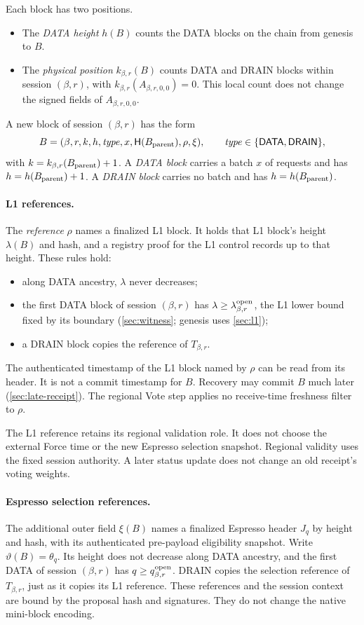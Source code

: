 \documentclass[11pt,a4paper]{article}
\newcommand{\Hash}{\mathsf H}
\newcommand{\tagg}[1]{\ensuremath{\mathsf{#1}}}
\newcommand{\defterm}[1]{\textcolor{rrBlue}{\textit{#1}}}
\begin{document}
Each block has two positions.
\begin{itemize}
\item The \defterm{DATA height} $h(B)$ counts the DATA blocks on the chain
from genesis to $B$.
\item The \defterm{physical position} $k_{\beta,r}(B)$ counts DATA and DRAIN blocks
within session $(\beta,r)$, with $k_{\beta,r}(A_{\beta,r,0,0})=0$. This local count does not change
the signed fields of $A_{\beta,r,0,0}$.
\end{itemize}
A new block of session $(\beta,r)$ has the form
\[
 B=(\beta,r,k,h,\mathit{type},x,\Hash(B_{\rm parent}),\rho,\xi),
 \qquad \mathit{type}\in\{\tagg{DATA},\tagg{DRAIN}\},
\]
with $k=k_{\beta,r}(B_{\rm parent})+1$. A \defterm{DATA block} carries a batch $x$ of
requests and has $h=h(B_{\rm parent})+1$. A \defterm{DRAIN block} carries no batch
and has $h=h(B_{\rm parent})$.

\paragraph{L1 references.}
The \defterm{reference} $\rho$ names a finalized L1 block. It holds that L1
block's height $\lambda(B)$ and hash, and a registry proof for the L1
control records up to that height. These rules hold:
\begin{itemize}
\item along DATA ancestry, $\lambda$ never decreases;
\item the first DATA block of session $(\beta,r)$ has $\lambda\ge
\lambda^{\rm open}_{\beta,r}$, the L1 lower bound fixed by its boundary
(\cref{sec:witness}; genesis uses \cref{sec:l1});
\item a DRAIN block copies the reference of $T_{\beta,r}$.
\end{itemize}
The authenticated timestamp of the L1 block named by $\rho$ can be
read from its header. It is not a commit timestamp for $B$. Recovery
may commit $B$ much later (\cref{sec:late-receipt}). The
regional Vote step applies no receive-time freshness filter to $\rho$.

The L1 reference retains its regional validation role. It does not
choose the external Force time or the new Espresso selection snapshot.
Regional validity uses the fixed session authority. A later status update
does not change an old receipt's voting weights.

\paragraph{Espresso selection references.}
The additional outer field $\xi(B)$ names a finalized Espresso header
$J_q$ by height and hash, with its authenticated pre-payload eligibility
snapshot. Write $\vartheta(B)=\theta_q$. Its height does not decrease
along DATA ancestry, and the first DATA of session $(\beta,r)$ has
$q\ge q_{\beta,r}^{\rm open}$. DRAIN copies the selection reference of $T_{\beta,r}$,
just as it copies its L1 reference. These references and the session
context are bound by the proposal hash and signatures. They do not
change the native mini-block encoding.
\end{document}
